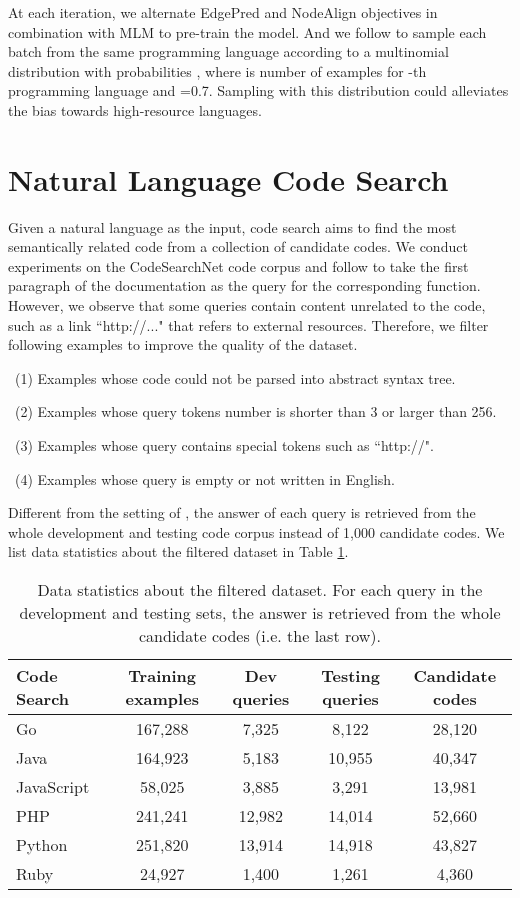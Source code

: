 \documentclass{article} \usepackage{iclr2021_conference,times}
\begin{document}
At each iteration, we alternate EdgePred and NodeAlign objectives in combination with MLM to pre-train the model. And we follow \citet{lample2019cross} to sample each batch from the same programming language according to a multinomial distribution with probabilities , where  is number of examples for -th programming language and =0.7. Sampling with this distribution could alleviates the bias towards high-resource languages.


\section{Natural Language Code Search}
Given a natural language as the input, code search aims to find the most semantically related code from a collection of candidate codes.
We conduct experiments on the CodeSearchNet code corpus \citep{husain2019codesearchnet} and follow \citet{husain2019codesearchnet} to take the first paragraph of the documentation as the query for the corresponding function. 
However, we observe that some queries contain content unrelated to the code, such as a link ``http://..." that refers to external resources. 
Therefore, we filter following examples to improve the quality of the dataset. 

\ (1) Examples whose code could not be parsed into abstract syntax tree.

\ (2) Examples whose query tokens number is  shorter than 3 or larger than 256.

\ (3) Examples whose query contains special tokens such as ``http://".

\ (4) Examples whose query is empty or not written in English.

Different from the setting of \citet{husain2019codesearchnet}, the answer of each query is retrieved from the whole development and testing code corpus instead of 1,000 candidate codes. 
We list data statistics about the filtered dataset in Table \ref{table-codesearchnet-data-statistic}.
\begin{table}[h]
	\begin{center}
		\begin{tabular}{l|c|c|c|c}
			\hline 
			Code Search & Training examples& Dev queries& Testing queries & Candidate codes \\
\hline 
			Go&167,288&7,325&8,122&28,120\\
			Java&164,923&5,183&10,955&40,347\\
			JavaScript&58,025&3,885&3,291&13,981\\
			PHP&241,241&12,982&14,014&52,660\\
			Python&251,820&13,914&14,918&43,827\\
			Ruby&24,927&1,400&1,261&4,360\\
			\hline 
		\end{tabular}
	\caption{Data statistics about the filtered dataset. For each query in the development and testing sets, the answer is retrieved from the whole candidate codes (i.e. the last row).}
	\label{table-codesearchnet-data-statistic}
	\end{center}
\end{table}
\end{document}
